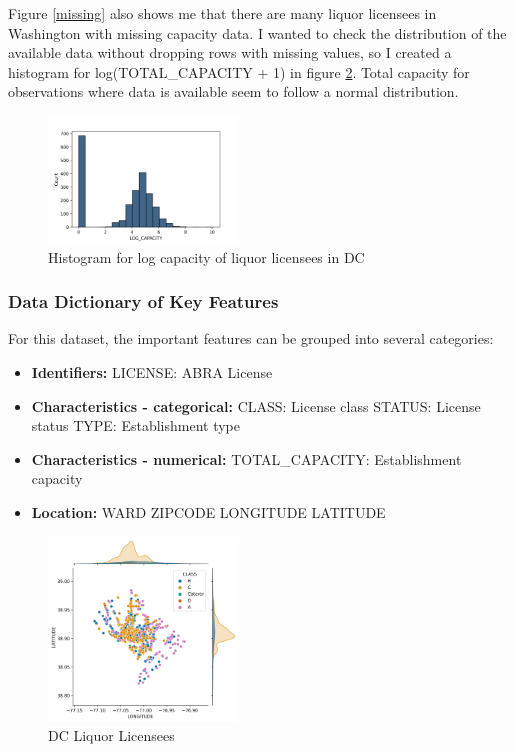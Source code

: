 \documentclass[12pt]{article}
\begin{document}
Figure \ref{missing} also shows me that there are many liquor licensees in Washington with missing capacity data. I wanted to check the distribution of the available data without dropping rows with missing values, so I created a histogram for log(TOTAL\_CAPACITY + 1) in figure \ref{log_cap}. Total capacity for observations where data is available seem to follow a normal distribution. 

\begin{figure}
\centering
\includegraphics[width = 0.45\textwidth]{../Figures/Data_cleaning_report/log_capacity_missing.png}
\caption{Histogram for log capacity of liquor licensees in DC}
\label{log_cap}
\end{figure}


\subsubsection*{Data Dictionary of Key Features}

For this dataset, the important features can be grouped into several categories:

\begin{itemize}
	\item \textbf{Identifiers:}
		\subitem LICENSE: ABRA License 
	\item \textbf{Characteristics - categorical:}
		\subitem CLASS: License class
		\subitem STATUS: License status
		\subitem TYPE: Establishment type

	\item \textbf{Characteristics - numerical:}
		\subitem TOTAL\_CAPACITY: Establishment capacity
		
	\item \textbf{Location:}
		\subitem WARD
		\subitem ZIPCODE
		\subitem LONGITUDE
		\subitem LATITUDE
\end{itemize}

\begin{figure}[h!]
\centering
\includegraphics[width = 0.45\textwidth]{../Figures/Data_cleaning_report/long_lat.png}
\caption{DC Liquor Licensees}
\label{log_cap}
\end{figure}
\end{document}
